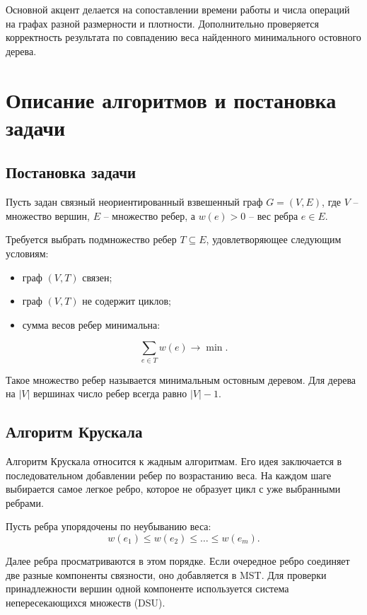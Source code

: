\documentclass[12pt,a4paper]{article}
\begin{document}
Основной акцент делается на сопоставлении времени работы и числа операций на графах разной размерности и плотности. Дополнительно проверяется корректность результата по совпадению веса найденного минимального остовного дерева.

\section{Описание алгоритмов и постановка задачи}
\label{sec:algorithms}

\subsection{Постановка задачи}

Пусть задан связный неориентированный взвешенный граф $G=(V,E)$, где $V$ -- множество вершин, $E$ -- множество ребер, а $w(e)>0$ -- вес ребра $e \in E$.

Требуется выбрать подмножество ребер $T \subseteq E$, удовлетворяющее следующим условиям:
\begin{itemize}
  \item граф $(V,T)$ связен;
  \item граф $(V,T)$ не содержит циклов;
  \item сумма весов ребер минимальна:
\end{itemize}
\begin{equation}
  \sum_{e\in T} w(e) \rightarrow \min.
\end{equation}

Такое множество ребер называется минимальным остовным деревом. Для дерева на $|V|$ вершинах число ребер всегда равно $|V|-1$.

\subsection{Алгоритм Крускала}

Алгоритм Крускала относится к жадным алгоритмам. Его идея заключается в последовательном добавлении ребер по возрастанию веса. На каждом шаге выбирается самое легкое ребро, которое не образует цикл с уже выбранными ребрами.

Пусть ребра упорядочены по неубыванию веса:
\begin{equation}
  w(e_1) \leq w(e_2) \leq \dots \leq w(e_m).
\end{equation}

Далее ребра просматриваются в этом порядке. Если очередное ребро соединяет две разные компоненты связности, оно добавляется в MST. Для проверки принадлежности вершин одной компоненте используется система непересекающихся множеств (DSU).
\end{document}
